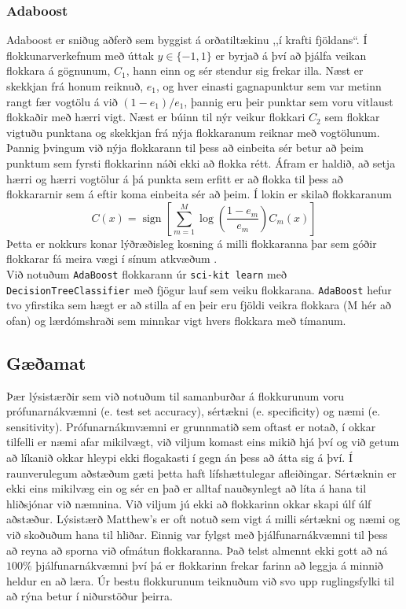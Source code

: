 \documentclass[11pt]{article}
\begin{document}
\subsubsection{Adaboost}
Adaboost er sniðug aðferð sem byggist á orðatiltækinu ,,í krafti fjöldans``. Í flokkunarverkefnum með úttak $y\in\{-1,1\}$ er byrjað á því að þjálfa veikan flokkara á gögnunum, $C_1$, hann einn og sér stendur sig frekar illa. Næst er skekkjan frá honum reiknuð, $e_1$, og hver einasti gagnapunktur sem var metinn rangt fær vogtölu á við $(1-e_1)/e_1$, þannig eru þeir punktar sem voru vitlaust flokkaðir með hærri vigt. Næst er búinn til nýr veikur flokkari $C_2$ sem flokkar vigtuðu punktana og skekkjan frá nýja flokkaranum reiknar með vogtölunum. Þannig þvingum við nýja flokkarann til þess að einbeita sér betur að þeim punktum sem fyrsti flokkarinn náði ekki að flokka rétt. Áfram er haldið, að setja hærri og hærri vogtölur á þá punkta sem erfitt er að flokka til þess að flokkararnir sem á eftir koma einbeita sér að þeim. Í lokin er skilað flokkaranum 
$$ C(x)=\operatorname{sign}\left[\sum_{m=1}^{M} \log \left(\frac{1-e_{m}}{ e_{m}}\right) C_{m}(x)\right] $$
Þetta er nokkurs konar lýðræðisleg kosning á milli flokkaranna þar sem góðir flokkarar fá meira vægi í sínum atkvæðum \cite{friedman2001elements}. \\
Við notuðum {\tt AdaBoost} flokkarann úr {\tt sci-kit learn} með {\tt DecisionTreeClassifier} með fjögur lauf sem veiku flokkarana. {\tt AdaBoost} hefur tvo yfirstika sem hægt er að stilla af en þeir eru fjöldi veikra flokkara (M hér að ofan) og lærdómshraði sem minnkar vigt hvers flokkara með tímanum.
\subsection{Gæðamat}
Þær lýsistærðir sem við notuðum til samanburðar á flokkurunum voru prófunarnákvæmni (e. test set accuracy), sértækni (e. specificity) og næmi (e. sensitivity). Prófunarnákmvæmni er grunnmatið sem oftast er notað, í okkar tilfelli er næmi afar mikilvægt, við viljum komast eins mikið hjá því og við getum að líkanið okkar hleypi ekki flogakasti í gegn án þess að átta sig á því. Í raunverulegum aðstæðum gæti þetta haft lífshættulegar afleiðingar. Sértæknin er ekki eins mikilvæg ein og sér en það er alltaf nauðsynlegt að líta á hana til hliðsjónar við næmnina. Við viljum jú ekki að flokkarinn okkar skapi úlf úlf aðstæður. Lýsistærð Matthew's er oft notuð sem vigt á milli sértækni og næmi og við skoðuðum hana til hliðar. Einnig var fylgst með þjálfunarnákvæmni til þess að reyna að sporna við ofmátun flokkaranna. Það telst almennt ekki gott að ná $100\%$ þjálfunarnákvæmni því þá er flokkarinn frekar farinn að leggja á minnið heldur en að læra. Úr bestu flokkurunum teiknuðum við svo upp ruglingsfylki til að rýna betur í niðurstöður þeirra.
\end{document}
